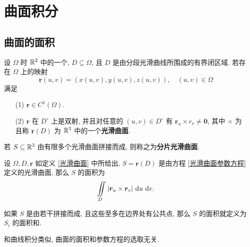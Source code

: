 \chapter{曲面积分}

\section{曲面的面积}

\begin{definition}\label{光滑曲面}
	设 $\Omega$ 时 $\mathbb R^2$ 中的一个, $D\subseteq\Omega$, 且 $D$ 是由分段光滑曲线所围成的有界闭区域. 若存在 $\Omega$ 上的映射
	\begin{equation}\label{光滑曲面参数方程}
		\bm r(u,v)=(x(u,v),y(u,v),z(u,v)),\quad (u,v)\in\Omega
	\end{equation}
	满足
	\begin{itemize}
		\item[(1)] $\bm r\in C^1(\Omega)$.
		\item[(2)] $\bm r$ 在 $D^\circ$ 上是双射, 并且对任意的 $(u,v)\in D^\circ$ 有 $\bm r_u\times r_v\neq\bm 0$, 其中 $\times$ 为且称 $\bm r(D)$ 为 $\mathbb R^3$ 中的一个\textbf{光滑曲面}.
	\end{itemize}

	若 $S\subseteq\mathbb R^3$ 由有限多个光滑曲面拼接而成, 则称之为\textbf{分片光滑曲面}.
\end{definition}

\begin{definition}
	设 $\Omega,D,\bm r$ 如定义 \ref{光滑曲面} 中所给出, $S=\bm r(D)$ 是由方程 \eqref{光滑曲面参数方程} 定义的光滑曲面, 那么 $S$ 的面积为
	\begin{equation}\label{曲面面积公式}
		\iint\limits_{D} |\bm r_u\times \bm r_v|\ \text {d} u\ \text {d} v.
	\end{equation}
\end{definition}

如果 $S$ 是由若干拼接而成, 且这些至多在边界处有公共点, 那么 $S$ 的面积就定义为 $S_i$ 的面积和.

\begin{proposition}
	和曲线积分类似, 曲面的面积和参数方程的选取无关.
\end{proposition}

